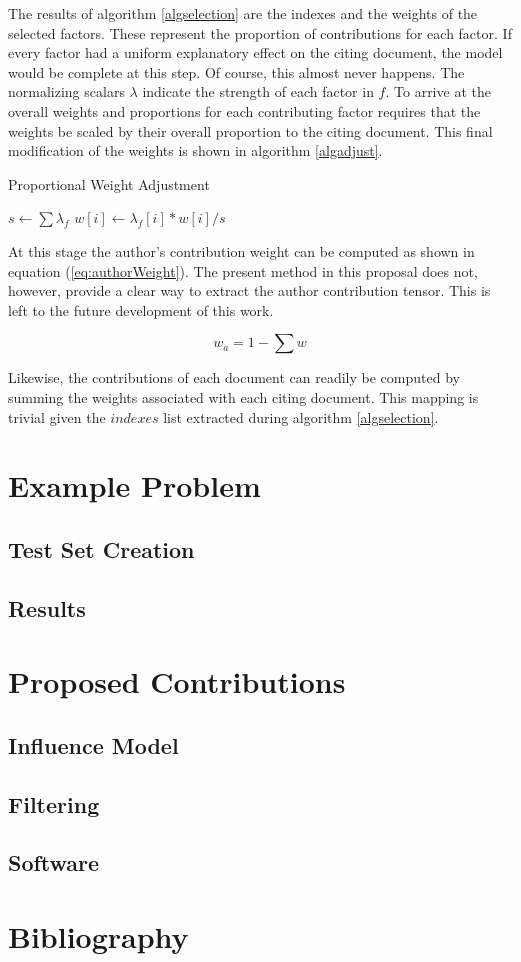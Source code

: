 \documentclass{article}
\begin{document}
The results of algorithm \ref{algselection} are the
indexes and the weights of the selected factors.  These represent the
proportion of contributions for each factor.  If every factor had
a uniform explanatory effect on the citing document, the model would
be complete at this step.  Of course, this almost never happens.  The
normalizing scalars $\lambda$ indicate the strength of each factor in
$f$.  To arrive at the overall weights and proportions for each
contributing factor requires that the weights be scaled by their
overall proportion to the citing document.  This final modification of
the weights is shown in algorithm \ref{algadjust}.

\begin{algorithm}
    \label{algadjust}
    \caption{Proportional Weight Adjustment}
    $s \leftarrow \sum \lambda_f$\;
     {
        $w[i] \leftarrow \lambda_f[i] * w[i] / s$\;
    }
\end{algorithm}

At this stage the author's contribution weight can be computed as
shown in equation (\ref{eq:authorWeight}).  The present method in this
proposal does not, however, provide a clear way to extract the author
contribution tensor.  This is left to the future development of this
work.

\begin{equation}
    \label{eq:authorWeight}
    w_a = 1 - \sum w
\end{equation}

Likewise, the contributions of each document can readily be computed
by summing the weights associated with each citing document.  This
mapping is trivial given the $indexes$ list extracted during algorithm
\ref{algselection}.

\section{Example Problem}
\subsection{Test Set Creation}
\subsection{Results}

\section{Proposed Contributions}
\subsection{Influence Model}
\subsection{Filtering}
\subsection{Software}

\section{Bibliography}
{}

\end{document}
